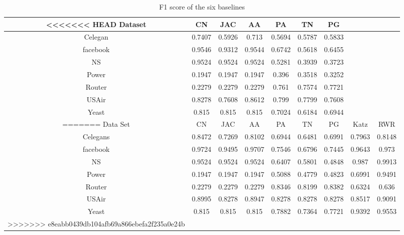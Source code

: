 \documentclass[12pt]{article}
\begin{document}
\begin{table}
	\begin{center}
		\begin{tabular}{|c|c|c|c|c|c|c|c|c|}
			\hline
<<<<<<< HEAD
			Dataset & CN & JAC & AA & PA & TN & PG \\
			\hline
			Celegan&0.7407&0.5926&0.713&0.5694&0.5787&0.5833\\
			facebook&0.9546&0.9312&0.9544&0.6742&0.5618&0.6455\\
			NS&0.9524&0.9524&0.9524&0.5281&0.3939&0.3723\\
			Power&0.1947&0.1947&0.1947&0.396&0.3518&0.3252\\
			Router&0.2279&0.2279&0.2279&0.761&0.7574&0.7721\\
			USAir&0.8278&0.7608&0.8612&0.799&0.7799&0.7608\\
			Yeast&0.815&0.815&0.815&0.7024&0.6184&0.6944\\
=======
			Data Set & CN & JAC & AA & PA & TN & PG & Katz & RWR \\
			\hline
			Celegans&0.8472&0.7269&0.8102&0.6944&0.6481&0.6991&0.7963&0.8148\\
			facebook&0.9724&0.9495&0.9707&0.7546&0.6796&0.7445&0.9643&0.973\\
			NS&0.9524&0.9524&0.9524&0.6407&0.5801&0.4848&0.987&0.9913\\
			Power&0.1947&0.1947&0.1947&0.5088&0.4779&0.4823&0.6991&0.9491\\
			Router&0.2279&0.2279&0.2279&0.8346&0.8199&0.8382&0.6324&0.636\\
			USAir&0.8995&0.8278&0.8947&0.8278&0.8278&0.8278&0.8517&0.9091\\
			Yeast&0.815&0.815&0.815&0.7882&0.7364&0.7721&0.9392&0.9553\\
>>>>>>> e8eabb0439db104afb69a866ebefa2f235a0e24b
			\hline
		\end{tabular}
	\end{center}
	\caption{F1 score of the six baselines}
	\label{tab:f1}
\end{table}
\end{document}
